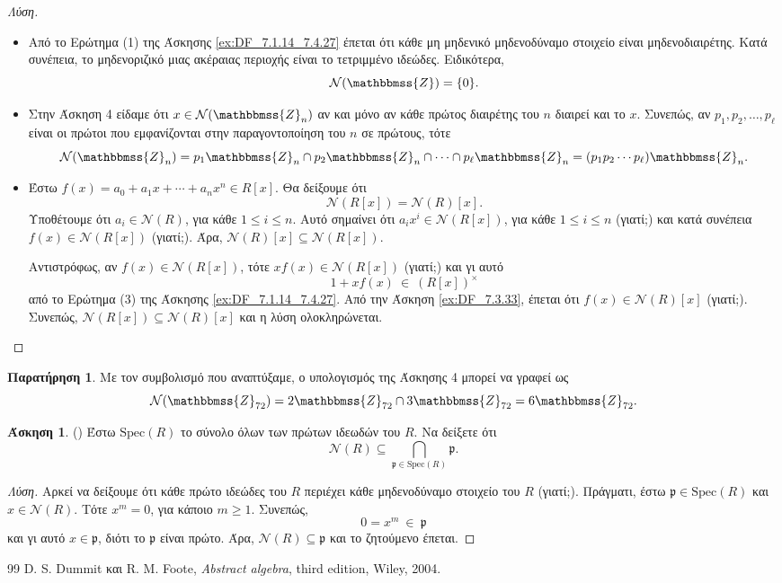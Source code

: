 \documentclass[12pt,a4paper,reqno]{amsart}
\theoremstyle{definition}
\newtheorem{exercise}{Άσκηση}
\newtheorem*{remark}{Παρατήρηση}
\newcommand{\ZZ}{\mathbbmss{Z}}
\newcommand{\fp}{\mathfrak{p}}
\newcommand{\nN}{\mathcal{N}}
\newcommand{\Spec}{\mathrm{Spec}}
\begin{document}
\begin{proof}[Λύση]
  \leavevmode
  \begin{itemize}
    \item[(1)] Από το Ερώτημα (1) της Άσκησης \ref{ex:DF_7.1.14_7.4.27} έπεται ότι κάθε μη μηδενικό μηδενοδύναμο στοι\-χείο είναι μηδενοδιαιρέτης. Κατά συνέπεια, το μηδενοριζικό μιας ακέραιας περιοχής είναι το τετριμμένο ιδεώδες. Ειδικότερα, 
    \[
    \nN(\ZZ) = \{0\}.
    \]

    \item[(2)] Στην Άσκηση 4 είδαμε ότι $x \in \nN(\ZZ_n)$ αν και μόνο αν κάθε πρώτος διαιρέτης του $n$ διαιρεί και το $x$. Συνεπώς, αν $p_1, p_2, \dots, p_\ell$ είναι οι πρώτοι που εμφανίζονται στην παραγοντοποίηση του $n$ σε πρώτους, τότε 
    \[
    \nN(\ZZ_n) = p_1\ZZ_n \cap p_2\ZZ_n \cap \cdots \cap p_\ell\ZZ_n = (p_1p_2\cdots{p_\ell})\ZZ_n.
    \]

    \item[(3)] Έστω $f(x) = a_0 + a_1x + \cdots + a_nx^n \in R[x]$. Θα δείξουμε ότι 
    \[
    \nN\left(
      R[x]
    \right) = \nN(R)[x].
    \]
    Υποθέτουμε ότι $a_i \in \nN(R)$, για κάθε $1 \le i \le n$. Αυτό σημαίνει ότι $a_ix^i \in \nN\left(R[x]\right)$, για κάθε $1 \le i \le n$ (γιατί;) και κατά συνέπεια $f(x) \in \nN\left(R[x]\right)$ (γιατί;). Άρα, $\nN(R)[x] \subseteq \nN\left(R[x]\right)$.

    Αντιστρόφως, αν $f(x) \in \nN\left(R[x]\right)$, τότε $xf(x) \in \nN\left(R[x]\right)$ (γιατί;) και γι αυτό 
    \[
    1 + xf(x) \ \in \ \left(R[x]\right)^\times
    \]
    από το Ερώτημα (3) της Άσκησης \ref{ex:DF_7.1.14_7.4.27}. Από την Άσκηση \ref{ex:DF_7.3.33}, έπεται ότι $f(x) \in \nN(R)[x]$ (γιατί;). Συνεπώς, $\nN\left(R[x]\right) \subseteq \nN(R)[x]$ και η λύση ολοκληρώνεται.
  \end{itemize}
\end{proof}

\begin{remark}
  Με τον συμβολισμό που αναπτύξαμε, ο υπολογισμός της Άσκησης 4 μπορεί να γραφεί ως 
  \[
  \nN(\ZZ_{72}) = 2\ZZ_{72} \cap 3\ZZ_{72} = 6\ZZ_{72}.
  \]
\end{remark}

\begin{exercise}{\rm(\cite[Άσκηση~7.4.26]{DF04})}
  Έστω $\Spec(R)$ το σύνολο όλων των πρώτων ιδεωδών του $R$. Να δείξετε ότι 
  \[
  \nN(R) \subseteq \bigcap_{\fp \in \Spec(R)} \fp.
  \]
\end{exercise}

\begin{proof}[Λύση]
  Αρκεί να δείξουμε ότι κάθε πρώτο ιδεώδες του $R$ περιέχει κάθε μηδενοδύναμο στοιχείο του $R$ (γιατί;). Πράγματι, έστω $\fp \in \Spec(R)$ και $x \in \nN(R)$. Τότε $x^m = 0$, για κάποιο $m \ge 1$. Συνεπώς,
  \[
  0 = x^m \ \in \ \fp 
  \]
  και γι αυτό $x \in \fp$, διότι το $\fp$ είναι πρώτο. Άρα, $\nN(R) \subseteq \fp$ και το ζητούμενο έπεται.
\end{proof}

\begin{thebibliography}{99}
    D. S. Dummit και R. M. Foote, 
    \textit{Abstract algebra},
    third edition, Wiley, 2004. 
\end{thebibliography}
\end{document}
